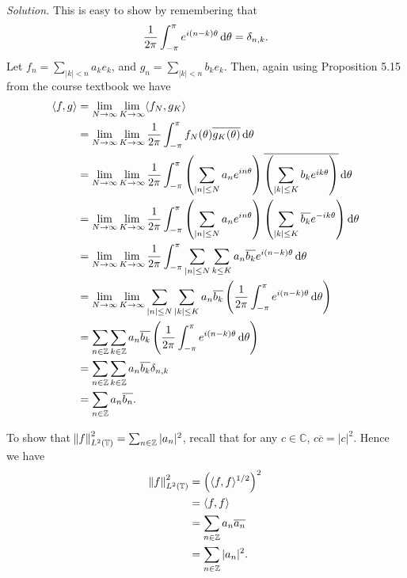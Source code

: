 \documentclass{article}
\newcommand{\T}{\mathbb{T}}
\newcommand{\C}{\mathbb{C}}
\newcommand{\Z}{\mathbb{Z}}
\begin{document}
\textit{Solution.}
This is easy to show by remembering that
%
\begin{equation*}
    \frac{1}{2 \pi} \int_{-\pi}^{\pi} e^{i (n - k) \theta} \dif \theta = \delta_{n, k}
    .
\end{equation*}
%
Let $f_n = \sum_{|k| < n} a_k e_k$, and $g_n = \sum_{|k| < n} b_k e_k$. Then,
again using Proposition 5.15 from the course textbook we have
%
\begin{align*}
    \langle f, g \rangle
        &= \lim_{N \to \infty} \lim_{K \to \infty} \langle f_N, g_K \rangle \\
        &= \lim_{N \to \infty} \lim_{K \to \infty} \frac{1}{2 \pi} \int_{- \pi}^\pi f_N(\theta) \overline{g_K(\theta)} \dif \theta \\
        &= \lim_{N \to \infty} \lim_{K \to \infty} \frac{1}{2 \pi} \int_{- \pi}^\pi \del{\sum_{|n| \leq N} a_n e^{i n \theta}} \overline{\del{\sum_{|k| \leq K} b_k e^{i k \theta}}} \dif \theta \\
        &= \lim_{N \to \infty} \lim_{K \to \infty} \frac{1}{2 \pi} \int_{- \pi}^\pi \del{\sum_{|n| \leq N} a_n e^{i n \theta}} \del{\sum_{|k| \leq K} \overline{b_{k}} e^{-i k \theta}} \dif \theta \\
        &= \lim_{N \to \infty} \lim_{K \to \infty} \frac{1}{2 \pi} \int_{- \pi}^\pi \sum_{|n| \leq N} \sum_{k \leq K} a_n \overline{b_{k}} e^{i (n - k) \theta} \dif \theta \\
        &= \lim_{N \to \infty} \lim_{K \to \infty} \sum_{|n| \leq N} \sum_{|k| \leq K} a_n \overline{b_{k}} \del{\frac{1}{2 \pi} \int_{- \pi}^\pi e^{i (n - k) \theta} \dif \theta} \\
        &= \sum_{n \in \Z} \sum_{k \in \Z} a_n \overline{b_{k}} \del{\frac{1}{2 \pi} \int_{- \pi}^\pi e^{i (n - k) \theta} \dif \theta} \\
        &= \sum_{n \in \Z} \sum_{k \in \Z} a_n \overline{b_{k}} \delta_{n, k} \\
        &= \sum_{n \in \Z} a_n \overline{b_{n}}
        .
\end{align*}

To show that $\norm{f}^2_{L^2(\T)} = \sum_{n \in \Z} |a_n|^2$, recall
that for any $c \in \C$, $c \overline{c} = |c|^2$. Hence we have
%
\begin{align*}
    \norm{f}^2_{L^2(\T)}
        &= \del{\langle f, f \rangle^{1/2}}^2 \\
        &= \langle f, f \rangle \\
        &= \sum_{n \in \Z} a_n \overline{a_{n}} \\
        &= \sum_{n \in \Z} |a_n|^2
        .
\end{align*}
\end{document}
